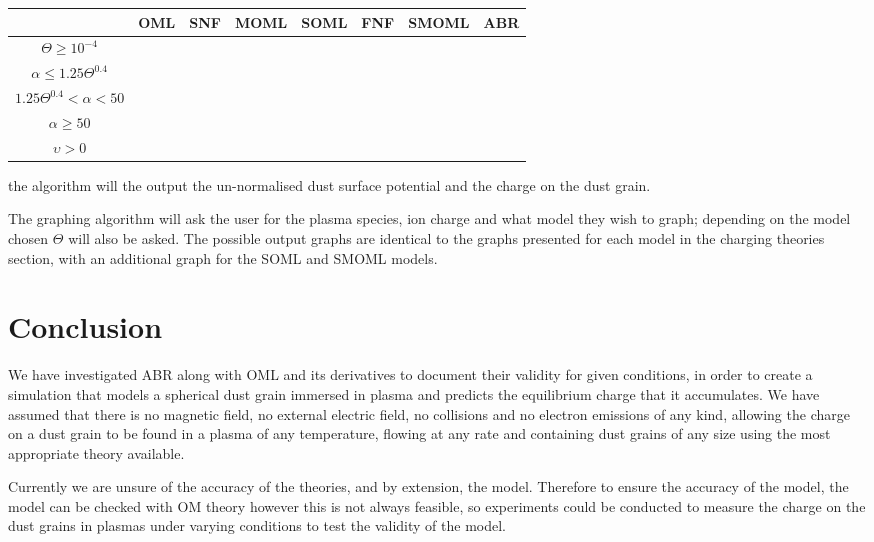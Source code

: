 \documentclass[journal]{Imperial_lab_report}
\newcommand{\cmark}{\ding{51}}
\begin{document}
\begin{center}
\begin{adjustbox}{width = \columnwidth}
\begin{tabular}{|c|c|c|c|c|c|c|c|} 
\hline
& OML& SNF & MOML & SOML &FNF&SMOML& ABR\\
\hline
 $\Theta \geq 10^{-4}$&\cmark&\cmark&\cmark&\cmark&\cmark&\cmark&\\
\hline
 $\alpha \leq 1.25\Theta^{0.4}$ &\cmark&&&\cmark&&&\cmark\\
\hline
 $1.25\Theta^{0.4} < \alpha <50$ &&\cmark&&&\cmark&&\cmark\\
\hline
$\alpha \geq 50$ &&&\cmark&&&\cmark&\cmark\\
\hline
$\upsilon > 0$  &&&&\cmark&\cmark&\cmark&\\
\hline
\end{tabular}
\end{adjustbox}
\end{center}

\medskip 

\noindent the algorithm will the output the un-normalised dust surface potential and the charge on the dust grain.

\medskip

The graphing algorithm will ask the user for the plasma species, ion charge and what model they wish to graph; depending on the model chosen $\Theta$ will also be asked. The possible output graphs are identical to the graphs presented for each model in the charging theories section, with an additional graph for the SOML and SMOML models.

\section{Conclusion}

We have investigated ABR along with OML and its derivatives to document their validity for given conditions, in order to create a simulation that models a spherical dust grain immersed in plasma and predicts the equilibrium charge that it accumulates. We have assumed that there is no magnetic field, no external electric field, no collisions and no electron emissions of any kind, allowing the charge on a dust grain to be found in a plasma of any temperature, flowing at any rate and containing dust grains of any size using the most appropriate theory available. 
\smallskip

Currently we are unsure of the accuracy of the theories, and by extension, the model. Therefore to ensure the accuracy of the model, the model can be checked with OM theory however this is not always feasible, so experiments could be conducted to measure the charge on the dust grains in plasmas under varying conditions to test the validity of the model.
\end{document}

